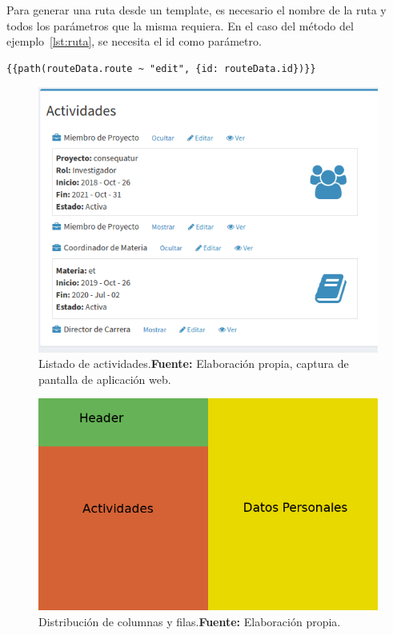 Para generar una ruta desde un template, es necesario el nombre de la ruta y todos los parámetros que la misma requiera. En el caso del método del ejemplo~\ref{lst:ruta}, se necesita el id como parámetro.


\begin{lstlisting}[caption={Generación de una ruta desde un template.\\Fuente: Elaboración propia.}, label={lst:path}]
{{path(routeData.route ~ "edit", {id: routeData.id})}}
\end{lstlisting}


\begin{figure}[H]
    \includegraphics[width=1\linewidth]{image/vista_persona.png}
    \caption[Listado de actividades]{Listado de actividades.\newline \textbf{Fuente:} Elaboración propia, captura de pantalla de aplicación web.}
    \label{fig:image/vista_persona}
\end{figure}


\begin{figure}[h]
    \includegraphics[width=1\linewidth]{image/grid.png}
    \caption[Distribución de columnas y filas]{Distribución de columnas y filas.\newline \textbf{Fuente:} Elaboración propia.}
    \label{fig:image/grid}
\end{figure}
